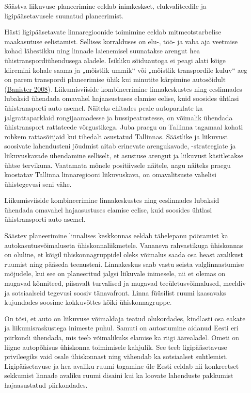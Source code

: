 \documentclass[estonian,]{article}
\begin{document}
\begin{blockquote-left}
Säästva liikuvuse planeerimine eeldab inimkeskset, elukvaliteedile ja
ligipääsetavusele suunatud planeerimist.
\end{blockquote-left}

Hästi ligipääsetavate linnaregioonide toimimine eeldab mitmeotstarbelise maakasutuse eelistamist. Sellises korralduses on elu-, töö- ja vaba aja veetmise kohad lähestikku ning linnade laienemisel suunatakse arengut hea ühistranspordiühendusega aladele. Isikliku sõiduautoga ei peagi alati kõige kiiremini kohale saama ja „mõistlik ummik`` või „mõistlik transpordile kuluv`` aeg on parem transpordi planeerimise ühik kui minutite kärpimine autosõidult (\protect\hyperlink{Banister2008}{Banister 2008}). Liikumisviiside kombineerimine linnakeskustes ning eeslinnades lubaksid ühendada omavahel hajaasustuses elamise eelise, kuid soosides ühtlasi ühistransporti auto asemel. Näiteks ehitades peale autoparklate ka jalgrattaparklaid rongijaamadesse ja bussipeatustesse, on võimalik ühendada ühistransport rattateede võrgustikega. Juba praegu on Tallinna tagamaal kohati rohkem rattasõitjaid kui tihedalt asustatud Tallinnas. Säästlike ja liikuvust soosivate lahendusteni jõudmist aitab erinevate arengukavade, -strateegiate ja liikuvuskavade ühendamine selliselt, et asustuse arengut ja liikuvust käsitletakse ühtse tervikuna. Vaatamata mõnele positiivsele näitele, nagu näiteks praegu koostatav Tallinna linnaregiooni liikuvuskava, on omavalitsuste vahelisi ühistegevusi seni vähe.

\begin{blockquote-left}
Liikumisviiside kombineerimine linnakeskustes ning eeslinnades lubaksid
ühendada omavahel hajaasustuses elamise eelise, kuid soosides ühtlasi
ühistransporti auto asemel.
\end{blockquote-left}

Säästev planeerimine linnalises keskkonnas eeldab tähelepanu pööramist ka autokasutusvõimaluseta ühiskonnaliikmetele. Vananeva rahvastikuga ühiskonnas on oluline, et kõigil ühiskonnagruppidel oleks võimalus saada osa heast avalikust ruumist ning pääseda teenusteni. Linnakeskus saab vastu seista valglinnastumise mõjudele, kui see on planeeritud jalgsi liikuvale inimesele, nii et olemas on mugavad kõnniteed, piisavalt turvalised ja mugavad teeületusvõimalused, meeldiv ja sotsiaalseid tegevusi soosiv tänavafront. Linna füüsilist ruumi kaasavaks kujundades soosime kokkuvõttes kõiki ühiskonnagruppe.

On tõsi, et auto on liikuvuse võimaldaja teatud olukordades, kindlasti osa eakate ja liikumisraskustega inimeste puhul. Samuti on autostumine aidanud Eesti eri piirkondi ühendada, mis teeb võimalikuks elamise ka riigi äärealadel. Ometi on liigne autopõhisus ühiskonna toimimisele kahjulik. See teeb ligipääsetavuse privileegiks vaid osale ühiskonnast ning vähendab ka sotsiaalset suhtlemist. Ligipääsetavuse ja hea avaliku ruumi tagamine üle Eesti eeldab nii konkreetset sekkumist linnade avaliku ruumi disaini kui ka loovate lahenduste pakkumist hajaasustatud piirkondades.
\end{document}
